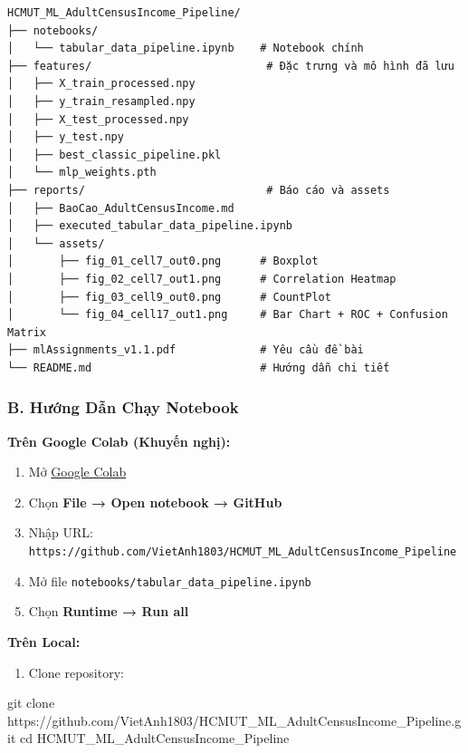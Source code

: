 \documentclass[
]{article}
\newenvironment{Shaded}{}{}
\newcommand{\BuiltInTok}[1]{\textcolor[rgb]{0.00,0.50,0.00}{#1}}
\newcommand{\FunctionTok}[1]{\textcolor[rgb]{0.02,0.16,0.49}{#1}}
\newcommand{\NormalTok}[1]{#1}
\providecommand{\tightlist}{%
  \setlength{\itemsep}{0pt}\setlength{\parskip}{0pt}}
\begin{document}
\begin{verbatim}
HCMUT_ML_AdultCensusIncome_Pipeline/
├── notebooks/
│   └── tabular_data_pipeline.ipynb    # Notebook chính
├── features/                           # Đặc trưng và mô hình đã lưu
│   ├── X_train_processed.npy
│   ├── y_train_resampled.npy
│   ├── X_test_processed.npy
│   ├── y_test.npy
│   ├── best_classic_pipeline.pkl
│   └── mlp_weights.pth
├── reports/                            # Báo cáo và assets
│   ├── BaoCao_AdultCensusIncome.md
│   ├── executed_tabular_data_pipeline.ipynb
│   └── assets/
│       ├── fig_01_cell7_out0.png      # Boxplot
│       ├── fig_02_cell7_out1.png      # Correlation Heatmap
│       ├── fig_03_cell9_out0.png      # CountPlot
│       └── fig_04_cell17_out1.png     # Bar Chart + ROC + Confusion Matrix
├── mlAssignments_v1.1.pdf             # Yêu cầu đề bài
└── README.md                          # Hướng dẫn chi tiết
\end{verbatim}

\subsubsection{B. Hướng Dẫn Chạy
Notebook}\label{b-hux1b0ux1edbng-dux1eabn-chux1ea1y-notebook}

\textbf{Trên Google Colab (Khuyến nghị):}

\begin{enumerate}
\def\labelenumi{\arabic{enumi}.}
\tightlist
\item
  Mở \href{https://colab.research.google.com/}{Google Colab}
\item
  Chọn \textbf{File → Open notebook → GitHub}
\item
  Nhập URL:
  \texttt{https://github.com/VietAnh1803/HCMUT\_ML\_AdultCensusIncome\_Pipeline}
\item
  Mở file \texttt{notebooks/tabular\_data\_pipeline.ipynb}
\item
  Chọn \textbf{Runtime → Run all}
\end{enumerate}

\textbf{Trên Local:}

\begin{enumerate}
\def\labelenumi{\arabic{enumi}.}
\tightlist
\item
  Clone repository:
\end{enumerate}

\begin{Shaded}
\begin{Highlighting}[]
\FunctionTok{git}\NormalTok{ clone https://github.com/VietAnh1803/HCMUT\_ML\_AdultCensusIncome\_Pipeline.git}
\BuiltInTok{cd}\NormalTok{ HCMUT\_ML\_AdultCensusIncome\_Pipeline}
\end{Highlighting}
\end{Shaded}
\end{document}
